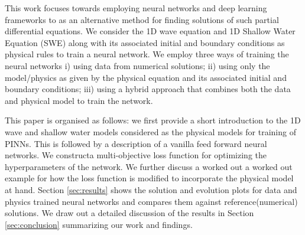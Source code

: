 \par
\noindent
This work focuses towards employing neural networks and deep learning frameworks to as an alternative method for finding  solutions of such partial differential equations. We consider the 1D wave equation and 1D Shallow Water Equation (SWE) along with its associated initial and boundary conditions as physical rules to train a neural network. We employ three ways of training the neural networks i) using data from numerical solutions; ii) using only the model/physics as given by the physical equation and its associated initial and boundary conditions; iii) using a hybrid approach that combines both the data and physical model to train the network.  
\par
\noindent
This paper is organised as follows: we first provide a short introduction to the 1D wave and shallow water models considered as the physical models for training of PINNs. This is followed by a description of a vanilla feed forward neural networks. We constructa multi-objective loss function for optimizing the hyperparameters of the network. We further discuss a worked out a worked out example for how the loss function is modified to incorporate the physical model at hand. Section \ref{sec:results} shows the solution and evolution plots for data and physics trained neural networks and compares them against  reference(numerical) solutions. We draw out a detailed discussion of the results in Section \ref{sec:conclusion} summarizing our work and findings.

